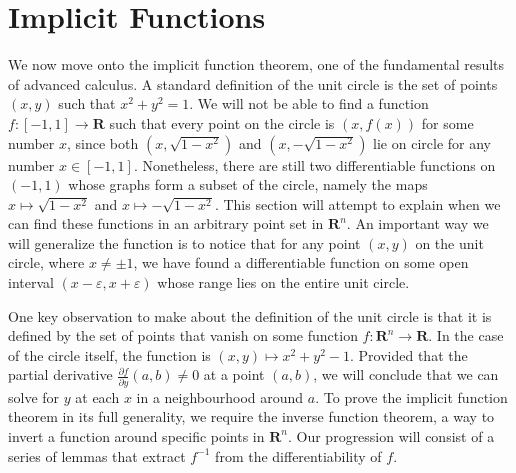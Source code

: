 \chapter{Implicit Functions}

We now move onto the implicit function theorem, one of the fundamental results of advanced calculus. A standard definition of the unit circle is the set of points $(x,y)$ such that $x^2 + y^2 = 1$. We will not be able to find a function $f:[-1,1] \to \mathbf{R}$ such that every point on the circle is $(x,f(x))$ for some number $x$, since both $(x, \sqrt{1 - x^2})$ and $(x, -\sqrt{1 - x^2})$ lie on circle for any number $x \in [-1, 1]$. Nonetheless, there are still two differentiable functions on $(-1,1)$ whose graphs form a subset of the circle, namely the maps $x \mapsto \sqrt{1 - x^2}$ and $x \mapsto -\sqrt{1 - x^2}$. This section will attempt to explain when we can find these functions in an arbitrary point set in $\mathbf{R}^n$. An important way we will generalize the function is to notice that for any point $(x,y)$ on the unit circle, where $x \neq \pm 1$, we have found a differentiable function on some open interval $(x - \varepsilon, x + \varepsilon)$ whose range lies on the entire unit circle.

One key observation to make about the definition of the unit circle is that it is defined by the set of points that vanish on some function $f:\mathbf{R}^n \to \mathbf{R}$. In the case of the circle itself, the function is $(x,y) \mapsto x^2 + y^2 - 1$. Provided that the partial derivative $\frac{\partial f}{\partial y} (a,b) \neq 0$ at a point $(a,b)$, we will conclude that we can solve for $y$ at each $x$ in a neighbourhood around $a$. To prove the implicit function theorem in its full generality, we require the inverse function theorem, a way to invert a function around specific points in $\mathbf{R}^n$. Our progression will consist of a series of lemmas that extract $f^{-1}$ from the differentiability of $f$.

